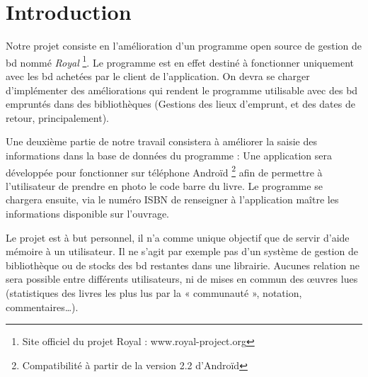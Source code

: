 \chapter*{Introduction}
Notre projet consiste en l'amélioration d'un programme open source de gestion de bd nommé \emph{Royal}
\footnote{Site officiel du projet Royal : www.royal-project.org}.
Le programme est en effet destiné à fonctionner uniquement avec les bd achetées par le client de l'application.
On devra se charger d'implémenter des améliorations qui rendent le programme utilisable avec des bd empruntés dans des bibliothèques 
(Gestions des lieux d'emprunt, et des dates de retour, principalement).

Une deuxième partie de notre travail consistera à améliorer la saisie des informations dans la base de données du programme : 
Une application sera développée pour fonctionner sur téléphone Androïd 
\footnote{Compatibilité à partir de la version 2.2 d'Androïd}
afin de permettre à l'utilisateur de prendre en photo le code barre du livre.
Le programme se chargera ensuite, via le numéro ISBN de renseigner à l'application maître les informations disponible sur l'ouvrage.

Le projet est à but personnel, il n'a comme unique objectif que de servir d'aide mémoire à un utilisateur.
Il ne s'agit par exemple pas d'un système de gestion de bibliothèque ou de stocks des bd restantes dans une librairie.
Aucunes relation ne sera possible entre différents utilisateurs, ni de mises en commun des œuvres lues
(statistiques des livres les plus lus par la « communauté », notation, commentaires…).
